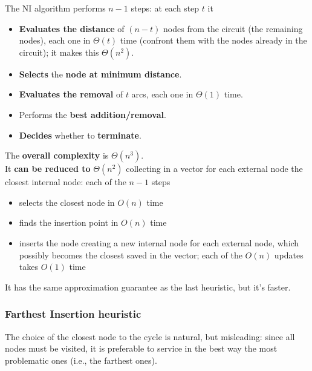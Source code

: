 \documentclass[11pt]{article}
\begin{document}
	\newpage
	
	The NI algorithm performs $n - 1$ steps: at each step $t$ it
	\begin{itemize}
		\item \textbf{Evaluates the distance} of $(n - t)$ nodes from the circuit (the remaining nodes), each one in $\Theta (t)$ time (confront them with the nodes already in the circuit); it makes this $\Theta (n^2)$.\\
		
		\item \textbf{Selects} the \textbf{node at minimum distance}.\\
		
		\item \textbf{Evaluates the removal} of $t$ arcs, each one in $\Theta (1)$ time.\\
		
		\item Performs the \textbf{best addition/removal}.\\
		
		\item \textbf{Decides} whether to \textbf{terminate}.\\
	\end{itemize}
	
	The \textbf{overall complexity} is $\Theta (n^3)$.\\
	
	It \textbf{can be reduced to} $\Theta (n^2)$ collecting in a vector for each external node the closest internal node: each of the $n - 1$ steps
	\begin{itemize}
		\item selects the closest node in $O (n)$ time
		\item finds the insertion point in $O (n)$ time
		\item inserts the node creating a new internal node for each external node, which possibly becomes the closest saved in the vector; each of the $O (n)$ updates takes $O (1)$ time
	\end{itemize}
	
	It has the same approximation guarantee as the last heuristic, but it's faster.\\
	
	\newpage
	
	\subsubsection{Farthest Insertion heuristic}
	The choice of the closest node to the cycle is natural, but misleading: since all nodes must be visited, it is preferable to service in the best way the most problematic ones (i.e., the farthest ones).\\
	
\end{document}
